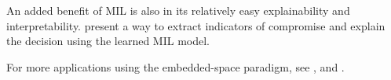 An added benefit of MIL is also in its relatively easy explainability and interpretability. \cite{pevny_nested_2020} present a way to extract indicators of compromise and explain the decision using the learned MIL model.

For more applications using the embedded-space paradigm, see \cite{cheplygina_multiple_2015}, \cite{chen_image_2004} \cite{foulds_learning_2008} and \cite{zhang_multi-instance_2009}.
